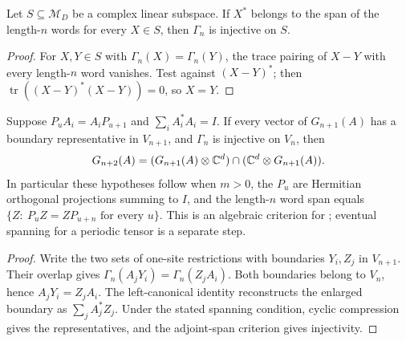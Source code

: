 \begin{lemma}
    \label{thm:boundary_injectivity_adjoint_span}
    \leanok
    Let $S\subseteq\mathcal M_D$ be a complex linear subspace.
    If $X^*$ belongs to the span of the length-$n$ words for every
    $X\in S$, then $\Gamma_n$ is injective on $S$.
\end{lemma}
\begin{proof}\leanok
    For $X,Y\in S$ with $\Gamma_n(X)=\Gamma_n(Y)$, the trace pairing
    of $X-Y$ with every length-$n$ word vanishes. Test against
    $(X-Y)^*$; then $\operatorname{tr}((X-Y)^*(X-Y))=0$, so $X=Y$.
\end{proof}

\begin{lemma}
    \label{thm:cyclic_boundary_intersection}
    \leanok
    Suppose $P_uA_i=A_iP_{u+1}$ and $\sum_iA_i^*A_i=I$.
    If every vector of $G_{n+1}(A)$ has a boundary representative in
    $V_{n+1}$, and $\Gamma_n$ is injective on $V_n$, then
    \begin{align}
        G_{n+2}(A)
        =(G_{n+1}(A)\otimes\mathbb C^d)
        \cap(\mathbb C^d\otimes G_{n+1}(A)).
        \notag
    \end{align}
    In particular these hypotheses follow when $m>0$, the $P_u$
    are Hermitian orthogonal projections summing to $I$, and
    the length-$n$ word span equals
    $\{Z:\ P_uZ=ZP_{u+n}\text{ for every }u\}$.
    This is an algebraic criterion for
    \cite[equations (3.10)--(3.11) and Lemma existenceinteraction]
    {Nachtergaele1996Spectral}; eventual spanning for a periodic tensor
    is a separate step.
\end{lemma}
\begin{proof}\leanok
    Write the two sets of one-site restrictions with boundaries $Y_i,Z_j$
    in $V_{n+1}$. Their overlap gives
    $\Gamma_n(A_jY_i)=\Gamma_n(Z_jA_i)$.
    Both boundaries belong to $V_n$, hence $A_jY_i=Z_jA_i$.
    The left-canonical identity reconstructs the enlarged boundary as
    $\sum_jA_j^*Z_j$.
    Under the stated spanning condition, cyclic compression gives
    the representatives, and the adjoint-span criterion gives injectivity.
\end{proof}

